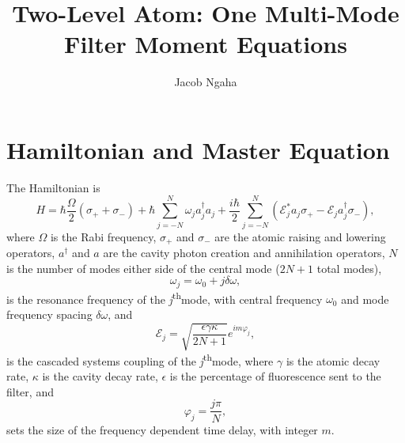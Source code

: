 \documentclass{article}
\title{Two-Level Atom: One Multi-Mode Filter Moment Equations}
\author{Jacob Ngaha}
\newcommand{\ssth}{\textsuperscript{th}}
\begin{document}
\maketitle

\section{Hamiltonian and Master Equation}

The Hamiltonian is
\begin{equation}
	H = \hbar \frac{\Omega}{2} \left( \sigma_{+} + \sigma_{-} \right) + \hbar \sum_{j=-N}^{N} \omega_{j} a^{\dagger}_{j} a_{j} + \frac{i \hbar}{2} \sum_{j=-N}^{N} \left( \mathcal{E}_{j}^{*} a_{j} \sigma_{+} - \mathcal{E}_{j} a^{\dagger}_{j} \sigma_{-} \right),
\end{equation}
where $\Omega$ is the Rabi frequency, $\sigma_{+}$ and $\sigma_{-}$ are the atomic raising and lowering operators, $a^{\dagger}$ and $a$ are the cavity photon creation and annihilation operators, $N$ is the number of modes either side of the central mode ($2N+1$ total modes),
\begin{equation}
	\omega_{j} = \omega_{0} + j \delta\omega,
\end{equation}
is the resonance frequency of the \textit{j}\ssth mode, with central frequency $\omega_{0}$ and mode frequency spacing $\delta\omega$, and
\begin{equation}
	\mathcal{E}_{j} = \sqrt{\frac{\epsilon \gamma \kappa}{2N + 1}} e^{i m \varphi_{j}},
\end{equation}
is the cascaded systems coupling of the \textit{j}\ssth mode, where $\gamma$ is the atomic decay rate, $\kappa$ is the cavity decay rate, $\epsilon$ is the percentage of fluorescence sent to the filter, and
\begin{equation}
	\varphi_{j} = \frac{j \pi}{N},
\end{equation}
sets the size of the frequency dependent time delay, with integer $m$.
\end{document}
